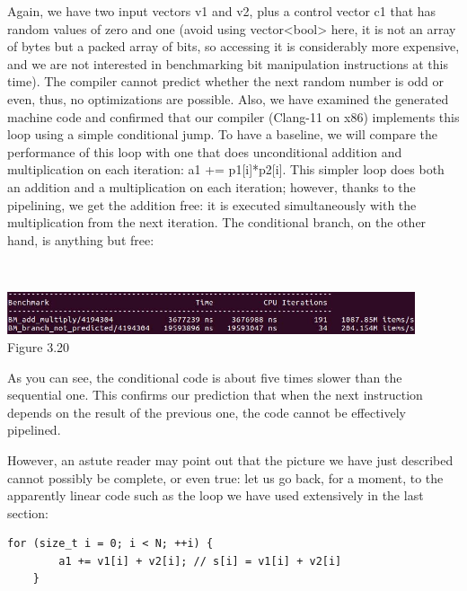 Again, we have two input vectors v1 and v2, plus a control vector c1 that has random values of zero and one (avoid using vector<bool> here, it is not an array of bytes but a packed array of bits, so accessing it is considerably more expensive, and we are not interested in benchmarking bit manipulation instructions at this time). The compiler cannot predict whether the next random number is odd or even, thus, no optimizations are possible. Also, we have examined the generated machine code and confirmed that our compiler (Clang-11 on x86) implements this loop using a simple conditional jump. To have a baseline, we will compare the performance of this loop with one that does unconditional addition and multiplication on each iteration: a1 += p1[i]*p2[i]. This simpler loop does both an addition and a multiplication on each iteration; however, thanks to the pipelining, we get the addition free: it is executed simultaneously with the multiplication from the next iteration. The conditional branch, on the other hand, is anything but free:

\hspace*{\fill} \\ %
\begin{center}
\includegraphics[width=0.9\textwidth]{content/1/chapter3/images/20.jpg}\\
Figure 3.20
\end{center}

As you can see, the conditional code is about five times slower than the sequential one. This confirms our prediction that when the next instruction depends on the result of the previous one, the code cannot be effectively pipelined.



However, an astute reader may point out that the picture we have just described cannot possibly be complete, or even true: let us go back, for a moment, to the apparently linear code such as the loop we have used extensively in the last section:

\begin{lstlisting}[style=styleCXX]
	for (size_t i = 0; i < N; ++i) {
		a1 += v1[i] + v2[i]; // s[i] = v1[i] + v2[i]
	}
\end{lstlisting}


